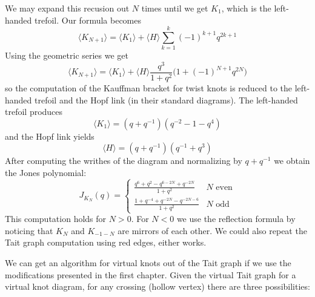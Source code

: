\documentclass{article}
\theoremstyle{plain}
\begin{document}
        We may expand this recusion out $N$ times until we get $K_{1}$,
        which is the left-handed trefoil. Our formula becomes
        \begin{equation}
            \langle{K_{N+1}}\rangle
            =\langle{K_{1}}\rangle
            +\langle{H}\rangle
            \sum_{k=1}^{k}(-1)^{k+1}q^{2k+1}
        \end{equation}
        Using the geometric series we get
        \begin{equation}
            \langle{K_{N+1}}\rangle
            =\langle{K_{1}}\rangle+\langle{H}\rangle
            \frac{q^{3}}{1+q^{2}}\big(1+(-1)^{N+1}q^{2N}\big)
        \end{equation}
        so the computation of the Kauffman bracket for twist knots is
        reduced to the left-handed trefoil and the Hopf link (in their
        standard diagrams). The left-handed trefoil produces
        \begin{equation}
            \langle{K_{1}}\rangle=(q+q^{-1})(q^{-2}-1-q^{4})
        \end{equation}
        and the Hopf link yields
        \begin{equation}
            \langle{H}\rangle=
            (q+q^{-1})(q^{-1}+q^{3})
        \end{equation}
        After computing the writhes of the diagram and normalizing
        by $q+q^{-1}$ we obtain the Jones polynomial:
        \begin{equation}
            J_{K_{N}}(q)
            =\begin{cases}
                \frac{q^{6}+q^{2}-q^{6-2N}+q^{-2N}}{1+q^{2}}
                &N\textrm{ even}\\
                \frac{1+q^{-4}+q^{-2N}-q^{-2N-6}}{1+q^{2}}
                &N\textrm{ odd}
            \end{cases}
        \end{equation}
        This computation holds for $N>0$. For $N<0$ we use the
        reflection formula by noticing that $K_{N}$ and $K_{-1-N}$ are
        mirrors of each other. We could also repeat the Tait graph
        computation using red edges, either works.
        \par\hfill\par
        We can get an algorithm for virtual knots out of the Tait graph
        if we use the modifications presented in the first chapter. Given
        the virtual Tait graph for a virtual knot diagram, for any
        crossing (hollow vertex) there are three possibilities:
\end{document}
